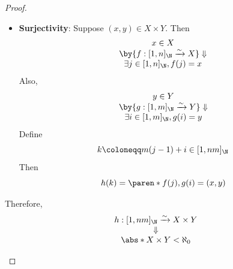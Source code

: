 \begin{proof}
\begin{itemize}
\begin{itemize}
\[\begin{array}{c}
                      g\paren*{k_{1} - m(j_{k_{1}} - 1)} = g\paren*{k_{2} - m(j_{k_{2}} - 1)} \\
                      \by{\ensuremath{g: [1, m]_{\N} \xrightarrow{\sim} Y}} \Downarrow        \\
                      k_{1} - m(j_{k_{1}} - 1) = k_{2} - m(j_{k_{2}} - 1)                     \\
                      \by{\ensuremath{j_{k_{1}} = j_{k_{2}}}} \Downarrow                      \\
                      k_{1} = k_{2}
                    \end{array}
                  \]
            \item \textbf{Surjectivity}: Suppose $(x, y) \in X \times Y$. Then
                  \[
                    \begin{array}{c}
                      x \in X                                                          \\
                      \by{\ensuremath{f: [1, n]_{\N} \xrightarrow{\sim} X}} \Downarrow \\
                      \exists j \in [1, n]_{\N}, f(j) = x
                    \end{array}
                  \]
                  Also,
                  \[
                    \begin{array}{c}
                      y \in Y                                                          \\
                      \by{\ensuremath{g: [1, m]_{\N} \xrightarrow{\sim} Y}} \Downarrow \\
                      \exists i \in [1, m]_{\N}, g(i) = y
                    \end{array}
                  \]
                  Define
                  \[
                    k \coloneqq m(j - 1) + i \in [1, nm]_{\N}
                  \]
                  Then
                  \[
                    h(k) = \paren*{f(j), g(i)} = (x, y)
                  \]
          \end{itemize}
          Therefore,
          \[
            \begin{array}{c}
              h: [1, nm]_{\N} \xrightarrow{\sim} X \times Y \\
              \Downarrow                                    \\
              \abs*{X \times Y} < \aleph_{0}
            \end{array}
          \]
  \end{itemize}
\end{proof}

